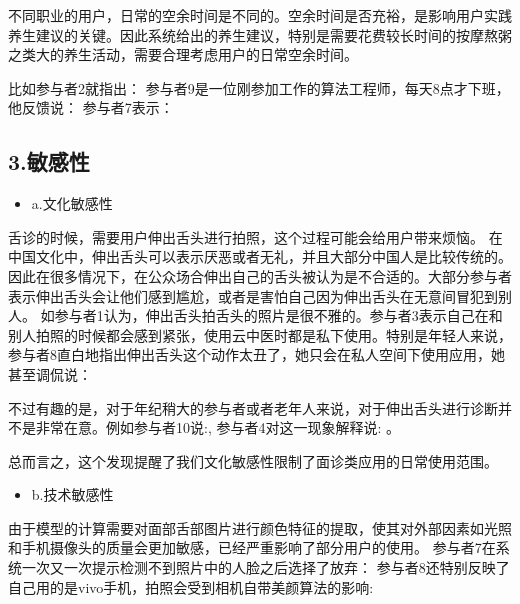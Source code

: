 不同职业的用户，日常的空余时间是不同的。空余时间是否充裕，是影响用户实践养生建议的关键。因此系统给出的养生建议，特别是需要花费较长时间的按摩熬粥之类大的养生活动，需要合理考虑用户的日常空余时间。

比如参与者2就指出：
参与者9是一位刚参加工作的算法工程师，每天8点才下班，他反馈说： 参与者7表示：

\subsection{3.敏感性}

\begin{itemize}
\item a.文化敏感性
\end{itemize}


舌诊的时候，需要用户伸出舌头进行拍照，这个过程可能会给用户带来烦恼。
在中国文化中，伸出舌头可以表示厌恶或者无礼，并且大部分中国人是比较传统的。因此在很多情况下，在公众场合伸出自己的舌头被认为是不合适的。大部分参与者表示伸出舌头会让他们感到尴尬，或者是害怕自己因为伸出舌头在无意间冒犯到别人。
如参与者1认为，伸出舌头拍舌头的照片是很不雅的。参与者3表示自己在和别人拍照的时候都会感到紧张，使用云中医时都是私下使用。特别是年轻人来说，参与者8直白地指出伸出舌头这个动作太丑了，她只会在私人空间下使用应用，她甚至调侃说：

不过有趣的是，对于年纪稍大的参与者或者老年人来说，对于伸出舌头进行诊断并不是非常在意。例如参与者10说:, 参与者4对这一现象解释说: 。 

总而言之，这个发现提醒了我们文化敏感性限制了面诊类应用的日常使用范围。


\begin{itemize}
\item b.技术敏感性
\end{itemize}


由于模型的计算需要对面部舌部图片进行颜色特征的提取，使其对外部因素如光照和手机摄像头的质量会更加敏感，已经严重影响了部分用户的使用。
参与者7在系统一次又一次提示检测不到照片中的人脸之后选择了放弃：
参与者8还特别反映了自己用的是vivo手机，拍照会受到相机自带美颜算法的影响: 

